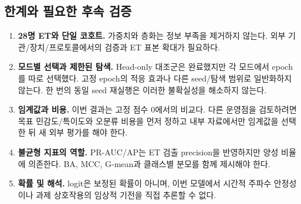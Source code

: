 \documentclass[11pt,a4paper]{article}
\begin{document}
\subsection{한계와 필요한 후속 검증}
\begin{enumerate}
 \item \textbf{28명 ET와 단일 코호트.} 가중치와 층화는 정보 부족을 제거하지 않는다.
 외부 기관/장치/프로토콜에서의 검증과 ET 표본 확대가 필요하다.
 \item \textbf{모드별 선택과 제한된 탐색.} Head-only 대조군은 완료했지만
 각 모드에서 epoch를 따로 선택했다. 고정 epoch의 적응 효과나 다른 seed/탐색 범위로
 일반화하지 않는다. 한 번의 동일 seed 재실행은 이러한 불확실성을 해소하지 않는다.
 \item \textbf{임계값과 비용.} 이번 결과는 고정 점수 0에서의 비교다.
 다른 운영점을 검토하려면 목표 민감도/특이도와 오분류 비용을 먼저 정하고
 내부 자료에서만 임계값을 선택한 뒤 새 외부 평가를 해야 한다.
 \item \textbf{불균형 지표의 역할.} PR-AUC/AP는 ET 검출 precision을 반영하지만
 양성 비율에 의존한다. BA, MCC, G-mean과 클래스별 분모를 함께 제시해야 한다.
 \item \textbf{확률 및 해석.} logit은 보정된 확률이 아니며,
 이번 모델에서 시간적 주파수 안정성이나 과제 상호작용의 임상적 기전을 직접 추론할 수 없다.
\end{enumerate}
\clearpage

\appendix
\end{document}
